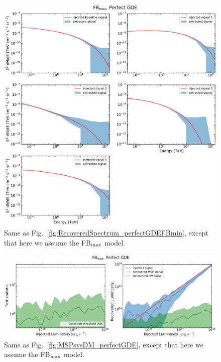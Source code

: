 \documentclass[doublespace,nopageskip]{VTthesis} %
\begin{document}
\begin{figure}
    \begin{center}
    \includegraphics[scale = 0.48]{Figures/CTA/all-signal-spectra-mis-False-Fermi-min-False.pdf}
    \caption{Same as Fig.~\ref{fig:RecoveredSpectrum_perfectGDEFBmin}, except that here we assume the FB$_{\rm max}$ model. }\label{fig:RecoveredSpectrum_perfectGDEFBmax}
    \end{center}
    \end{figure}

\begin{figure}
    \begin{center}
    \includegraphics[scale = 0.48]{Figures/CTA/TS-dm-mis-False-Fermi-min-False.pdf}
\caption{Same as Fig.~\ref{fig:MSPsvsDM_perfectGDE}, except that here we assume the FB$_{\rm max}$ model.}\label{fig:MSPsvsDM_perfectGDEFBmax}
    \end{center}
\end{figure}
\end{document}
